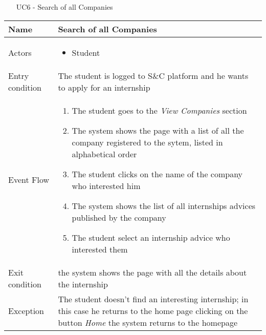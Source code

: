 				
				\begin{table} [H]
					\centering
					\begin{itemize}
						\item [UC6] - Search of all Companies
					\end{itemize}
					\begin{tabular}{|| P{7.5cm} | P{7.5cm} ||}
						\hline
						Name & Search of all Companies \\
						\hline
						Actors & \parbox{5cm}{\begin{itemize}
								\item Student
							\end{itemize}
						} \\
						\hline
						Entry condition & The student is logged to S\&C platform and he wants to apply for an internship \\
						\hline
						Event Flow & \parbox{5cm}{\begin{enumerate}
								\item The student goes to the \textit{View 
									Companies} section
								\item The system shows the page with a 
								list of all the company registered to 
								the sytem, listed in alphabetical 
								order   
								\item The student clicks on the name of 
								the company who interested him
								\item The system shows the list of all 
								internships advices published by 
								the company 
								\item The student select an internship advice who 
								interested them
						\end{enumerate}} \\
						\hline 
						Exit condition &  the system shows the 
						page with all the details about the 
						internship \\
						\hline
						Exception & The student doesn’t find an interesting 
						internship; in this case he returns to the 
						home page clicking on the button \textit{Home}
						the system returns to the homepage 
						\\
						\hline
					\end{tabular}
				\end{table}
				
				
				
